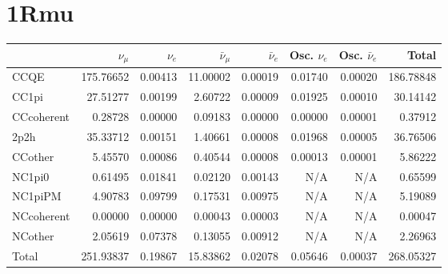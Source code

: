 \documentclass[10pt,a4paper]{article}
\begin{document}
\section*{1Rmu}
\begin{tabular} { | l ||r | r | r | r | r | r | | r | }
\hline
              & $\nu_\mu$            & $\nu_e$              & $\bar{\nu}_{\mu}$    & $\bar{\nu}_{e}$      & Osc. $\nu_e$         & Osc. $\bar{\nu}_{e}$ & Total                \\ \hline\hline
 CCQE         & 175.76652            & 0.00413              & 11.00002             & 0.00019              & 0.01740              & 0.00020              & 186.78848            \\ \hline
 CC1pi        & 27.51277             & 0.00199              & 2.60722              & 0.00009              & 0.01925              & 0.00010              & 30.14142             \\ \hline
 CCcoherent   & 0.28728              & 0.00000              & 0.09183              & 0.00000              & 0.00000              & 0.00001              & 0.37912              \\ \hline
 2p2h         & 35.33712             & 0.00151              & 1.40661              & 0.00008              & 0.01968              & 0.00005              & 36.76506             \\ \hline
 CCother      & 5.45570              & 0.00086              & 0.40544              & 0.00008              & 0.00013              & 0.00001              & 5.86222              \\ \hline
 NC1pi0       & 0.61495              & 0.01841              & 0.02120              & 0.00143              & N/A                  & N/A                  & 0.65599              \\ \hline
 NC1piPM      & 4.90783              & 0.09799              & 0.17531              & 0.00975              & N/A                  & N/A                  & 5.19089              \\ \hline
 NCcoherent   & 0.00000              & 0.00000              & 0.00043              & 0.00003              & N/A                  & N/A                  & 0.00047              \\ \hline
 NCother      & 2.05619              & 0.07378              & 0.13055              & 0.00912              & N/A                  & N/A                  & 2.26963              \\ \hline
\hline
 Total        & 251.93837            & 0.19867              & 15.83862             & 0.02078              & 0.05646              & 0.00037              & 268.05327            \\ \hline

\end{tabular}
\end{document}
